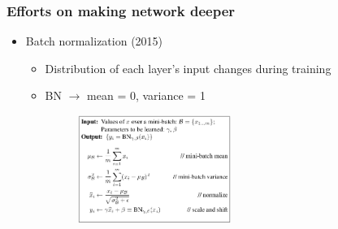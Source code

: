 \documentclass[serif,mathserif]{beamer}
\begin{document}
\begin{frame}
  \frametitle{Efforts on making network deeper}
  \begin{itemize}
  \item Batch normalization (2015)
    \begin{itemize}
    \item Distribution of each layer's input changes during training
    \item BN $\rightarrow$ mean = 0, variance = 1
       {
      \begin{figure}
        \includegraphics[width=0.5\textwidth]{img/BN}
      \end{figure}
      }
    \end{itemize}
  \end{itemize}
\end{frame}
\end{document}
